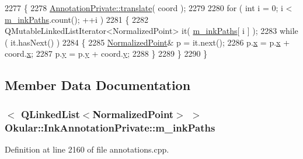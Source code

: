 \begin{DoxyCode}
2277 \{
2278     \hyperlink{classOkular_1_1AnnotationPrivate_aee9684802697da01c33c4dec9de56ee1}{AnnotationPrivate::translate}( coord );
2279 
2280     \textcolor{keywordflow}{for} ( \textcolor{keywordtype}{int} i = 0; i < \hyperlink{classOkular_1_1InkAnnotationPrivate_a4fcd86538f8aeca3558d430b9d9473b5}{m\_inkPaths}.count(); ++i )
2281     \{
2282         QMutableLinkedListIterator<NormalizedPoint> it( \hyperlink{classOkular_1_1InkAnnotationPrivate_a4fcd86538f8aeca3558d430b9d9473b5}{m\_inkPaths}[ i ] );
2283         \textcolor{keywordflow}{while} ( it.hasNext() )
2284         \{
2285             \hyperlink{classOkular_1_1NormalizedPoint}{NormalizedPoint}& p = it.next();
2286             p.\hyperlink{classOkular_1_1NormalizedPoint_a857f49b9bc7712430d167472ef9dbd94}{x} = p.\hyperlink{classOkular_1_1NormalizedPoint_a857f49b9bc7712430d167472ef9dbd94}{x} + coord.\hyperlink{classOkular_1_1NormalizedPoint_a857f49b9bc7712430d167472ef9dbd94}{x};
2287             p.\hyperlink{classOkular_1_1NormalizedPoint_ac2276daabda627d5f82bb1532c293047}{y} = p.\hyperlink{classOkular_1_1NormalizedPoint_ac2276daabda627d5f82bb1532c293047}{y} + coord.\hyperlink{classOkular_1_1NormalizedPoint_ac2276daabda627d5f82bb1532c293047}{y};
2288         \}
2289     \}
2290 \}
\end{DoxyCode}


\subsection{Member Data Documentation}
\hypertarget{classOkular_1_1InkAnnotationPrivate_a4fcd86538f8aeca3558d430b9d9473b5}{
\subsubsection[{m\+\_\+ink\+Paths}]{$<$ {\bf Q\+Linked\+List}$<${\bf Normalized\+Point}$>$ $>$ Okular\+::\+Ink\+Annotation\+Private\+::m\+\_\+ink\+Paths}}\label{classOkular_1_1InkAnnotationPrivate_a4fcd86538f8aeca3558d430b9d9473b5}


Definition at line 2160 of file annotations.\+cpp.

